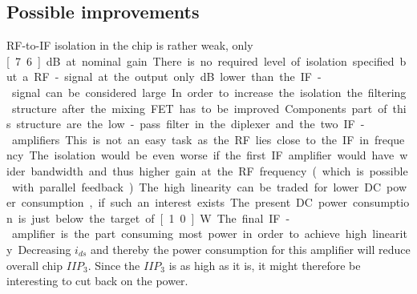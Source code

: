 		\subsection{Possible improvements}
			RF-to-IF isolation in the chip is rather weak, only \unit[7.6]{dB} at nominal gain. There is no required level of isolation specified but a RF-signal at the output only \unit[18]{dB} lower than the IF-signal can be considered large. In order to increase the isolation the filtering structure after the mixing FET has to be improved. Components part of this structure are the low-pass filter in the diplexer and the two IF-amplifiers. This is not an easy task as the RF lies close to the IF in frequency. The isolation would be even worse if the first IF amplifier would have wider bandwidth and thus higher gain at the RF frequency (which is possible with parallel feedback).
			
			The high linearity can be traded for lower DC power consumption, if such an interest exists. The present DC power consumption is just below the target of \unit[1.0]{W}. The final IF-amplifier is the part consuming most power in order to achieve high linearity. Decreasing $i_{ds}$ and thereby the power consumption for this amplifier will reduce overall chip $IIP_3$. Since the $IIP_3$ is as high as it is, it might therefore be interesting to cut back on the power.

